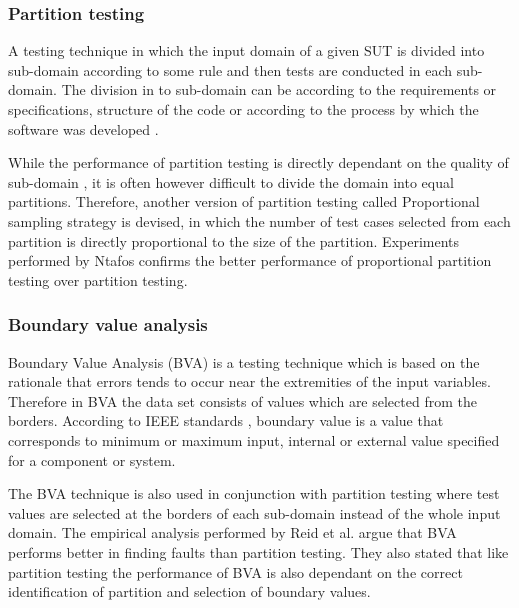 \subsubsection{Partition testing}
A testing technique in which the input domain of a given SUT is divided into sub-domain according to some rule and then tests are conducted in each sub-domain. The division in to sub-domain can be according to the requirements or specifications, structure of the code or according to the process by which the software was developed \cite{hamlet1990}. 

\noindent While the performance of partition testing is directly dependant on the quality of sub-domain \cite{weyuker1991analyzing}, it is often however difficult to divide the domain into equal partitions. Therefore, another version of partition testing called Proportional sampling strategy \cite{Chan1996} is devised, in which the number of test cases selected from each partition is directly proportional to the size of the partition. Experiments performed by Ntafos \cite{ntafos1998random} confirms the better performance of proportional partition testing over partition testing.


\subsubsection{Boundary value analysis}
Boundary Value Analysis (BVA) is a testing technique which is based on the rationale that errors tends to occur near the extremities of the input variables. Therefore in BVA the data set consists of values which are selected from the borders. According to IEEE standards \cite{radatz1990ieee}, boundary value is a value that corresponds to minimum or maximum input, internal or external value specified for a component or system. 

\noindent The BVA technique is also used in conjunction with partition testing where test values are selected at the borders of each sub-domain instead of the whole input domain. The empirical analysis performed by Reid et al. \cite{reid1997empirical} argue that BVA performs better in finding faults than partition testing. They also stated that like partition testing the performance of BVA is also dependant on the correct identification of partition and selection of boundary values.

